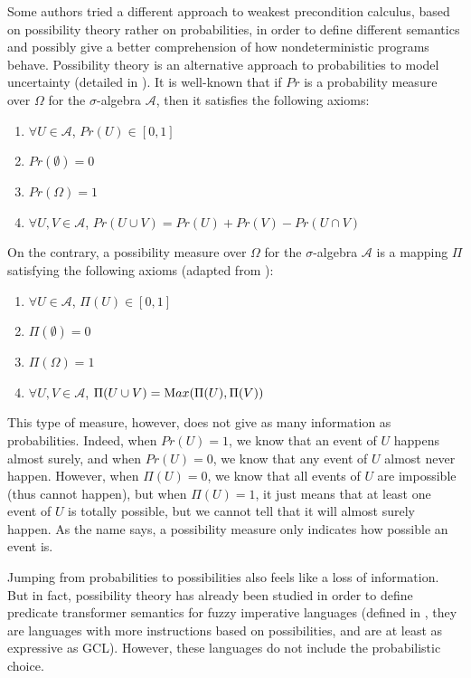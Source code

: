 \documentclass[a4paper,10pt]{llncs}
\def\Max {{\textnormal Max}}
\begin{document}
Some authors \cite{WuChen08,WuChen11,WuChen12} tried a different approach to weakest precondition calculus, based on possibility theory rather on probabilities, in order to define different semantics and possibly give a better comprehension of how nondeterministic programs behave.
Possibility theory is an alternative approach to probabilities to model uncertainty (detailed in \cite{Agarwal15,Shapiro09}). It is well-known that if $Pr$ is a probability measure over $\Omega$ for the $\sigma$-algebra $\mathcal{A}$, then it satisfies the following axioms:
\begin{enumerate}
\item $\forall U \in \mathcal{A}$, $Pr(U) \in [0,1]$
\item $Pr(\emptyset) = 0$
\item $Pr(\Omega) = 1$
\item $\forall U,V \in \mathcal{A}$, $Pr(U \cup V) = Pr(U) + Pr(V) - Pr(U \cap V)$
\end{enumerate}
On the contrary, a possibility measure over $\Omega$ for the $\sigma$-algebra $\mathcal{A}$ is a mapping $\Pi$ satisfying the following axioms (adapted from \cite{Agarwal15,Shapiro09} ):
\begin{enumerate}
\item $\forall U \in \mathcal{A}$, $\Pi(U) \in [0,1]$
\item $\Pi(\emptyset) = 0$
\item $\Pi(\Omega) = 1$
\item $\forall U,V \in \mathcal{A}$, $\Pi(U \cup V) = \Max( \Pi(U), \Pi(V))$
\end{enumerate}
This type of measure, however, does not give as many information as probabilities. Indeed, when $Pr(U) = 1$, we know that an event of $U$ happens almost surely, and when $Pr(U) = 0$, we know that any event of $U$ almost never happen. However, when $\Pi(U) = 0$, we know that all events of $U$ are impossible (thus cannot happen), but when $\Pi(U) = 1$, it just means that at least one event of $U$ is totally possible, but we cannot tell that it will almost surely happen. As the name says, a possibility measure only indicates how possible an event is.\bigskip

Jumping from probabilities to possibilities also feels like a loss of information. But in fact, possibility theory has already been studied \cite{WuChen08,WuChen11,WuChen12} in order to define predicate transformer semantics for fuzzy imperative languages (defined in \cite{Bueno93,Bueno97}, they are languages with more instructions based on possibilities, and are at least as expressive as GCL). However, these languages do not include the probabilistic choice.\bigskip
\end{document}
